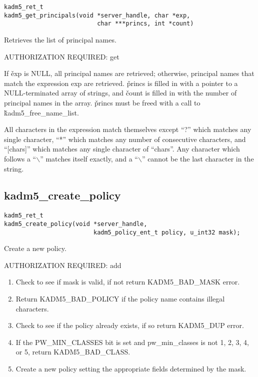 \begin{verbatim}
kadm5_ret_t
kadm5_get_principals(void *server_handle, char *exp,
                          char ***princs, int *count)
\end{verbatim}

Retrieves the list of principal names.  

AUTHORIZATION REQUIRED: get

If \v{exp} is NULL, all principal names are retrieved; otherwise,
principal names that match the expression exp are retrieved.
\v{princs} is filled in with a pointer to a NULL-terminated array of
strings, and \v{count} is filled in with the number of principal names
in the array.  \v{princs} must be freed with a call to
\v{kadm5_free_name_list}.

All characters in the expression match themselves except ``?'' which
matches any single character, ``*'' which matches any number of
consecutive characters, and ``[chars]'' which matches any single
character of ``chars''. Any character which follows a ``$\backslash$''
matches itself exactly, and a ``$\backslash$'' cannot be the last
character in the string.

\subsection{kadm5_create_policy}

\begin{verbatim}
kadm5_ret_t
kadm5_create_policy(void *server_handle,
                         kadm5_policy_ent_t policy, u_int32 mask); 
\end{verbatim}

Create a new policy.

AUTHORIZATION REQUIRED: add

\begin{enumerate}
\item Check to see if mask is valid, if not return KADM5_BAD_MASK error.
\item Return KADM5_BAD_POLICY if the policy name contains illegal
characters.

\item Check to see if the policy already exists, if so return
KADM5_DUP error. 
\item If the PW_MIN_CLASSES bit is set and pw_min_classes is not 1, 2,
3, 4, or 5, return KADM5_BAD_CLASS.
\item Create a new policy setting the appropriate fields determined
by the mask.
\end{enumerate}

